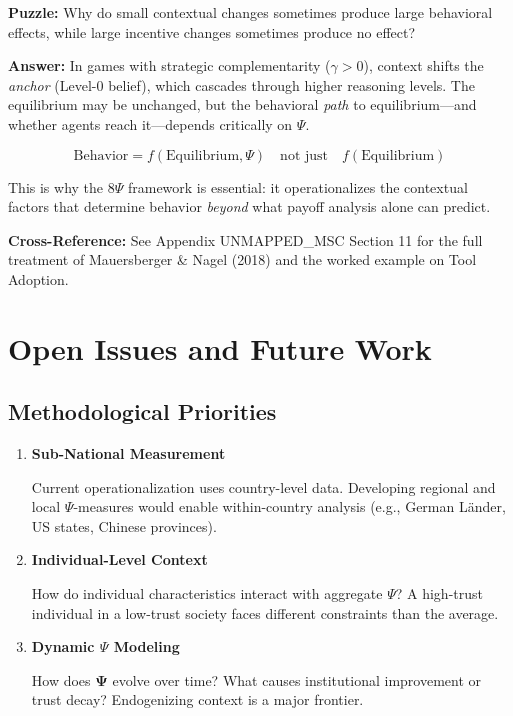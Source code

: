 \textbf{Puzzle:} Why do small contextual changes sometimes produce large behavioral effects,
while large incentive changes sometimes produce no effect?

\textbf{Answer:} In games with strategic complementarity ($\gamma > 0$), context shifts
the \textit{anchor} (Level-0 belief), which cascades through higher reasoning levels.
The equilibrium may be unchanged, but the behavioral \textit{path} to equilibrium---and
whether agents reach it---depends critically on $\Psi$.

\begin{equation}
\text{Behavior} = f(\text{Equilibrium}, \Psi) \quad \text{not just} \quad f(\text{Equilibrium})
\tag{V-DESIGN}
\end{equation}

This is why the 8$\Psi$ framework is essential: it operationalizes the contextual factors
that determine behavior \textit{beyond} what payoff analysis alone can predict.

\textbf{Cross-Reference:} See Appendix UNMAPPED_MSC Section 11 for the full treatment of
Mauersberger \& Nagel (2018) and the worked example on Tool Adoption.


\section{Open Issues and Future Work}
\label{sec:V-open}

\subsection{Methodological Priorities}

\begin{enumerate}
    \item \textbf{Sub-National Measurement}
    
    Current operationalization uses country-level data. Developing regional 
    and local $\Psi$-measures would enable within-country analysis (e.g., 
    German Länder, US states, Chinese provinces).
    
    \item \textbf{Individual-Level Context}
    
    How do individual characteristics interact with aggregate $\Psi$? 
    A high-trust individual in a low-trust society faces different constraints 
    than the average.
    
    \item \textbf{Dynamic $\Psi$ Modeling}
    
    How does $\boldsymbol{\Psi}$ evolve over time? What causes institutional 
    improvement or trust decay? Endogenizing context is a major frontier.
\end{enumerate}

